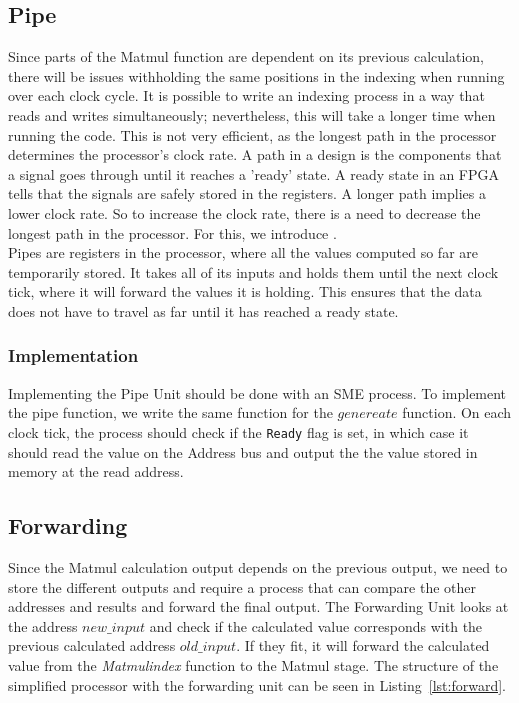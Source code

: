  \subsection{Pipe}
Since parts of the Matmul function are dependent on its previous calculation,
there will be issues withholding the same positions in the indexing when running over each clock cycle. It is possible to write an indexing process in a way that reads and writes simultaneously; nevertheless, this will take a longer time when running the code. This is not very efficient, as the longest path in the processor determines the processor’s clock rate. A path
in a design is the components that a signal goes through until it reaches a
'ready' state. A ready state in an FPGA tells that the signals are safely
stored in the registers. A longer path implies a lower clock rate.
So to increase the clock rate, there is a need to decrease the longest path in the processor. For this, we introduce .\\
Pipes are registers in the processor, where all the values computed so far are
temporarily stored. It takes all of its inputs and holds them until the next
clock tick, where it will forward the values it is holding. This ensures that the data does not have to travel as far until it has reached a ready state.

\subsubsection*{Implementation}
Implementing the Pipe Unit should be done with an SME process. 
To implement the pipe function, we write the same function for the $genereate$ function.
On each clock tick, the process should check if the \texttt{Ready} flag is
set, in which case it should read the value on the Address bus and output the
the value stored in memory at the read address.


\subsection{Forwarding}
Since the Matmul calculation output depends on the previous output, we need to store the different outputs and require a process that can compare the other addresses and results and forward the final output.
The Forwarding Unit looks at the address $new\_input$ and check if the calculated value corresponds with the previous calculated address $old\_input$. If they fit, it will forward the calculated value 
from the \emph{Matmulindex} function to 
the Matmul stage. The structure of the simplified processor with the forwarding unit can be seen in Listing~\ref{lst:forward}.

